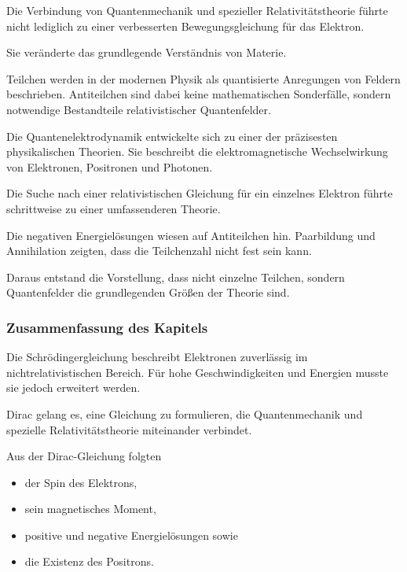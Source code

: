 Die Verbindung von Quantenmechanik und spezieller Relativitätstheorie
führte nicht lediglich zu einer verbesserten Bewegungsgleichung für
das Elektron.

Sie veränderte das grundlegende Verständnis von Materie.

Teilchen werden in der modernen Physik als quantisierte Anregungen von
Feldern beschrieben. Antiteilchen sind dabei keine mathematischen
Sonderfälle, sondern notwendige Bestandteile relativistischer
Quantenfelder.

Die Quantenelektrodynamik entwickelte sich zu einer der präzisesten
physikalischen Theorien. Sie beschreibt die elektromagnetische
Wechselwirkung von Elektronen, Positronen und Photonen.

\begin{HistoryBox}
	\label{box:vom_elektron_zur_quantenfeldtheorie}
	
	Die Suche nach einer relativistischen Gleichung für ein einzelnes
	Elektron führte schrittweise zu einer umfassenderen Theorie.
	
	Die negativen Energielösungen wiesen auf Antiteilchen hin. Paarbildung
	und Annihilation zeigten, dass die Teilchenzahl nicht fest sein kann.
	
	Daraus entstand die Vorstellung, dass nicht einzelne Teilchen, sondern
	Quantenfelder die grundlegenden Größen der Theorie sind.
\end{HistoryBox}

\subsubsection*{Zusammenfassung des Kapitels}

Die Schrödingergleichung beschreibt Elektronen zuverlässig im
nichtrelativistischen Bereich. Für hohe Geschwindigkeiten und Energien
musste sie jedoch erweitert werden.

Dirac gelang es, eine Gleichung zu formulieren, die Quantenmechanik und
spezielle Relativitätstheorie miteinander verbindet.

Aus der Dirac-Gleichung folgten

\begin{itemize}
	\item der Spin des Elektrons,
	\item sein magnetisches Moment,
	\item positive und negative Energielösungen sowie
	\item die Existenz des Positrons.
\end{itemize}

